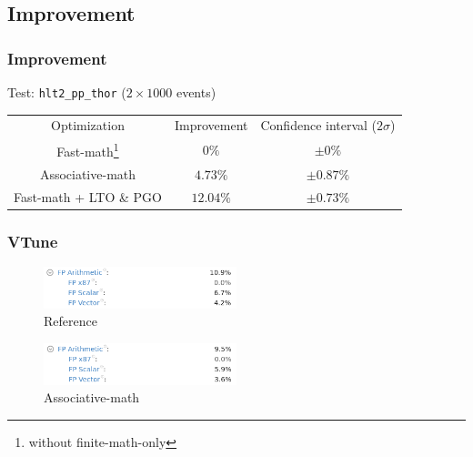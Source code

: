 \documentclass{beamer}
\begin{document}
\begin{frame}
    \tableofcontents[currentsection]
\end{frame}

\subsection{Improvement}

\begin{frame}[fragile]
    \frametitle{Improvement}

    Test: \verb'hlt2_pp_thor' ($2 \times 1000$ events)
    \begin{center}
        \begin{tabular}{ c c c }
            Optimization                                 & Improvement & Confidence interval ($2\sigma$) \\
            Fast-math\footnote{without finite-math-only} & $0\%$       & $\pm 0\%$                       \\
            Associative-math                             & $4.73\%$    & $\pm 0.87\%$                    \\
            Fast-math + LTO \& PGO                       & $12.04\%$   & $\pm 0.73\%$
        \end{tabular}
    \end{center}
\end{frame}

\begin{frame}[fragile]
    \frametitle{VTune}

    \begin{figure}[!htb]
        \includegraphics[width=0.5\textwidth, center]{reference_vtune.png}
        \caption{Reference}
    \end{figure}

    \begin{figure}[!htb]
        \includegraphics[width=0.5\textwidth, center]{associative-math_vtune.png}
        \caption{Associative-math}
    \end{figure}
\end{frame}
\end{document}
